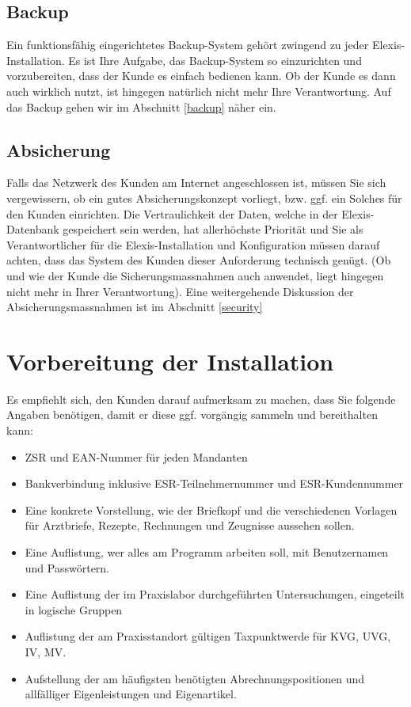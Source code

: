 \documentclass[paper=a4,BCOR8.25mm,twoside]{scrartcl}
\begin{document}
\subsection{Backup}
Ein funktionsfähig eingerichtetes Backup-System gehört zwingend zu jeder Elexis-Installation. Es ist Ihre Aufgabe, das Backup-System so einzurichten und vorzubereiten, dass der Kunde es einfach bedienen kann. Ob der Kunde es dann auch wirklich nutzt, ist hingegen natürlich nicht mehr Ihre Verantwortung. Auf das Backup gehen wir im Abschnitt \ref{backup} näher ein.

\subsection{Absicherung}
Falls das Netzwerk des Kunden am Internet angeschlossen ist, müssen Sie sich vergewissern, ob ein gutes Absicherungskonzept vorliegt, bzw. ggf. ein Solches für den Kunden einrichten. Die Vertraulichkeit der Daten, welche in der Elexis-Datenbank gespeichert sein werden, hat allerhöchste Priorität und Sie als Verantwortlicher für die Elexis-Installation und Konfiguration müssen darauf achten, dass das System des Kunden dieser Anforderung technisch genügt. (Ob und wie der Kunde die Sicherungsmassnahmen auch anwendet, liegt hingegen nicht mehr in Ihrer Verantwortung). Eine weitergehende Diskussion der Absicherungsmassnahmen ist im Abschnitt \ref{security}

\section{Vorbereitung der Installation}
\label{besprechung}
Es empfiehlt sich, den Kunden darauf aufmerksam zu machen, dass Sie folgende Angaben benötigen, damit er diese ggf. vorgängig sammeln und bereithalten kann:
\begin{itemize}
    \item ZSR und EAN-Nummer für jeden Mandanten
    \item Bankverbindung inklusive ESR-Teilnehmernummer und ESR-Kundennummer
    \item Eine konkrete Vorstellung, wie der Briefkopf und die verschiedenen Vorlagen für Arztbriefe, Rezepte, Rechnungen und Zeugnisse aussehen sollen.
    \item Eine Auflistung, wer alles am Programm arbeiten soll, mit Benutzernamen und Passwörtern.
    \item Eine Auflistung der im Praxislabor durchgeführten Untersuchungen, eingeteilt in logische Gruppen
    \item Auflistung der am Praxisstandort gültigen Taxpunktwerde für KVG, UVG, IV, MV.
    \item Aufstellung der am häufigsten benötigten Abrechnungspositionen und allfälliger Eigenleistungen und Eigenartikel.
\end{itemize}
\end{document}
